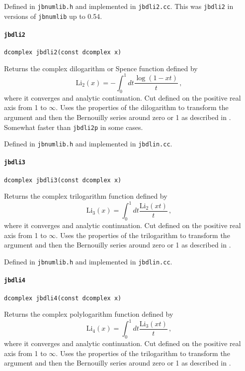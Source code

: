 \documentclass[12pt,a4paper]{article}
\newcommand{\mytt}[1]{\texttt{#1}}
\newcommand{\newfunction}[1]{\mytt{#1}\index{\mytt{#1}}}
\begin{document}
Defined in \mytt{jbnumlib.h} and implemented in \mytt{jbdli2.cc}. This was
\mytt{jbdli2} in versions of \mytt{jbnumlib} up to 0.54.

\paragraph{\newfunction{jbdli2}}

\mytt{dcomplex jbdli2(const dcomplex x)}

Returns the complex dilogarithm or Spence function defined by
\begin{equation}
\mathrm{Li_2}(x) = -\int_0^1 dt \frac{\log(1-xt)}{t}\,,
\end{equation}
where it converges and analytic continuation. Cut defined on the
positive real axis from 1 to $\infty$.
Uses the properties of the dilogarithm to transform the argument
and then the Bernouilly series around zero or 1 as described in
\cite{Frellesvig:2016ske}. Somewhat faster than \mytt{jbdli2p} in
some cases.

Defined in \mytt{jbnumlib.h} and implemented in \mytt{jbdlin.cc}.

\paragraph{\newfunction{jbdli3}}

\mytt{dcomplex jbdli3(const dcomplex x)}

Returns the complex trilogarithm function defined by
\begin{equation}
\mathrm{Li_3}(x) = \int_0^1 dt \frac{\mathrm{Li}_2(xt)}{t}\,,
\end{equation}
where it converges and analytic continuation. Cut defined on the
positive real axis from 1 to $\infty$.
Uses the properties of the trilogarithm to transform the argument
and then the Bernouilly series around zero or 1 as described in
\cite{Frellesvig:2016ske}.

Defined in \mytt{jbnumlib.h} and implemented in \mytt{jbdlin.cc}.

\paragraph{\newfunction{jbdli4}}

\mytt{dcomplex jbdli4(const dcomplex x)}

Returns the complex polylogarithm function defined by
\begin{equation}
\mathrm{Li_4}(x) = \int_0^1 dt \frac{\mathrm{Li}_3(xt)}{t}\,,
\end{equation}
where it converges and analytic continuation. Cut defined on the
positive real axis from 1 to $\infty$.
Uses the properties of the trilogarithm to transform the argument
and then the Bernouilly series around zero or 1 as described in
\cite{Frellesvig:2016ske}.
\end{document}
